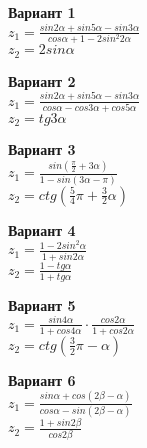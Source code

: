 \documentclass[11pt]{article} %
\begin{document}
\begin{flushleft}


\Large\textbf{Вариант 1} \\
$ z_1 = \frac{sin 2\alpha + sin 5\alpha - sin 3\alpha}{cos \alpha + 1 - 2 sin^2 2\alpha} $ \\
\vspace{0.5\baselineskip}
$ z_2 = 2 sin\alpha $

\par

\Large\textbf{Вариант 2} \\
$ z_1 = \frac{sin 2\alpha + sin 5\alpha - sin 3\alpha}{cos \alpha - cos 3\alpha + cos 5\alpha} $ \\
\vspace{0.5\baselineskip}
$ z_2 = tg 3\alpha $

\par 

\Large\textbf{Вариант 3} \\
$ z_1 = \frac{sin\left(\frac{\pi}{2} + 3\alpha\right)}{1 - sin\left(3\alpha - \pi\right)} $ \\
\vspace{0.5\baselineskip}
$ z_2 = ctg\left(\frac{5}{4}\pi + \frac{3}{2}\alpha\right) $

\par

\Large\textbf{Вариант 4} \\
$ z_1 = \frac{1 - 2 sin^2 \alpha}{1 + sin 2\alpha} $ \\
\vspace{0.5\baselineskip}
$ z_2 = \frac{1 - tg\alpha}{1 + tg\alpha} $

\par

\Large\textbf{Вариант 5} \\
$ z_1 = \frac{sin 4\alpha}{1 + cos 4\alpha} \cdot \frac{cos 2\alpha}{1 + cos 2\alpha} $ \\
\vspace{0.5\baselineskip}
$ z_2 = ctg\left( \frac{3}{2}\pi - \alpha \right) $

\par

\Large\textbf{Вариант 6} \\
$ z_1 = \frac{sin\alpha + cos\left(2\beta - \alpha\right)}{cos\alpha - sin\left(2\beta - \alpha\right)} $ \\
\vspace{0.5\baselineskip}
$ z_2 = \frac{1 + sin 2\beta}{cos 2\beta} $ 


\end{flushleft}
\end{document}
